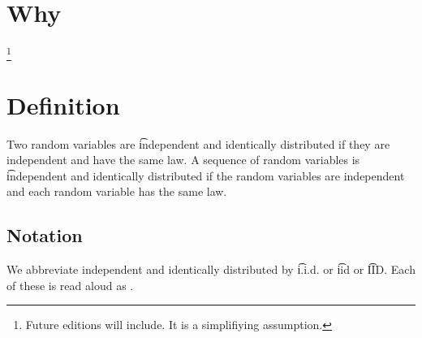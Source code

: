 

\section*{Why}
\footnote{Future editions will include. It is a simplifiying assumption.}
\section*{Definition}

Two random variables are \t{independent and identically distributed} if they are independent and have the same law.
A sequence of random variables is \t{independent and identically distributed} if the random variables are independent and each random variable has the same law.

\subsection*{Notation}

We abbreviate independent and identically distributed by \t{i.i.d.} or \t{iid} or \t{IID}.
Each of these is read aloud as .

\blankpage
